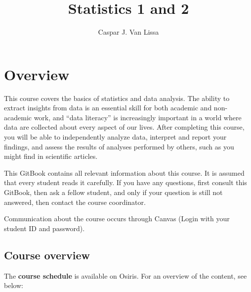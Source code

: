 \documentclass[
  letterpaper,
]{scrbook}
\title{Statistics 1 and 2}
\author{Caspar J. Van Lissa}
\date{}
\renewcommand*\contentsname{Table of contents}
\newcommand\contentsname{Table of contents}
\begin{document}
\frontmatter
\maketitle
\ifdefined\Shaded\renewenvironment{Shaded}{\begin{tcolorbox}[sharp corners, frame hidden, boxrule=0pt, interior hidden, borderline west={3pt}{0pt}{shadecolor}, breakable, enhanced]}{\end{tcolorbox}}\fi

\renewcommand*\contentsname{Table of contents}
{
\setcounter{tocdepth}{2}
\tableofcontents
}
\mainmatter
{}

\hypertarget{overview}{%
\chapter*{Overview}\label{overview}}


This course covers the basics of statistics and data analysis. The
ability to extract insights from data is an essential skill for both
academic and non-academic work, and ``data literacy'' is increasingly
important in a world where data are collected about every aspect of our
lives. After completing this course, you will be able to independently
analyze data, interpret and report your findings, and assess the results
of analyses performed by others, such as you might find in scientific
articles.

This GitBook contains all relevant information about this course. It is
assumed that every student reads it carefully. If you have any
questions, first consult this GitBook, then ask a fellow student, and
only if your question is still not answered, then contact the course
coordinator.

Communication about the course occurs through Canvas (Login with your
student ID and password).

\hypertarget{course-overview}{%
\section*{Course overview}\label{course-overview}}


The \textbf{course schedule} is available on Osiris. For an overview of
the content, see below:
\end{document}
